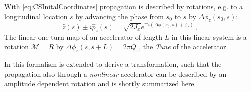 With \cref{eq:CSInitalCoordinates} propagation is described by rotations, e.g. to a longitudinal location $s$ 
by advancing the phase from $s_0$ to $s$ by $\Delta\phi_z(s_0, s)$:
%
\begin{equation}
    \label{eq:CSCoordinates}
   \hat{z}(s) \pm i\hat{p}_z(s) = \sqrt{2J_x}e^{\mp i \left( \Delta\phi(s_0, s) + \phi_z \right)} \, ,
\end{equation}
%
The linear one-turn-map of an accelerator of length $L$ in this linear system is a rotation $\mathcal{M} = R$
 by $\Delta\phi_z(s, s+L) = 2\pi Q_z$, the \textit{Tune} of the accelerator. 

In \cite{ForestHamiltonianFreeDescription1990,TomasDirectMeasurementResonance2003,FranchiStudiesMeasurementsLinear2006,CarlierNonlinearFutureMeasurements2020}
this formalism is extended to derive a transformation, such that the propagation also through a \textit{nonlinear} accelerator 
can be described by an amplitude dependent rotation and is shortly summarized here.


